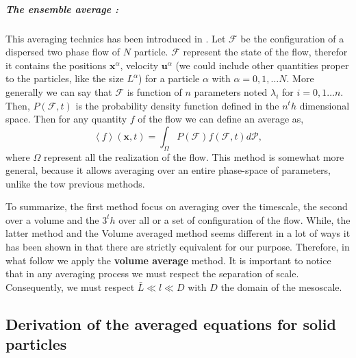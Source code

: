 \subparagraph*{The ensemble average :} 
This averaging technics has been introduced in \citet{zhang1994averaged}.
Let $\mathcal{F}$ be the configuration of a dispersed two phase flow of $N$ particle. 
$\mathcal{F}$ represent the state of the flow, therefor it contains the positions $\bm{x}^\alpha$, velocity $\bm{u}^\alpha$ (we could include other quantities proper to the particles, like the size $L^\alpha$) for a particle $\alpha$ with $\alpha = 0,1,\ldots N$.
More generally we can say that $\mathcal{F}$ is function of $n$ parameters noted $\lambda_i$ for $i = 0,1 \ldots n$.  
Then, $P(\mathcal{F},t)$ is the probability density function defined in the $n^th$ dimensional space. 
Then for any quantity $f$ of the flow we can define an average as,
\begin{equation}
    \label{eq:enselblea}
    \left<f\right>(\bm{x},t) = \int_\Omega P(\mathcal{F}) f(\mathcal{F},t)d\mathcal{P},
\end{equation}
where $\Omega$ represent all the realization of the flow. 
This method is somewhat more general, because it allows averaging over an entire phase-space of parameters, unlike the tow previous methods. 

To summarize, the first method focus on averaging over the timescale, the second over a volume and the $3^th$ over all or a set of configuration of the flow.
While, the latter method and the Volume averaged method seems different in a lot of ways it has been shown in \citet{jackson1997locally} that there are strictly equivalent for our purpose.
Therefore, in what follow we apply the \textbf{volume average} method.
It is important to notice that in any averaging process we must respect the separation of scale. 
Consequently, we must respect $\bar{L}\ll l\ll D$ with $D$ the domain of the mesoscale. 

\subsection{Derivation of the averaged equations for solid particles}

